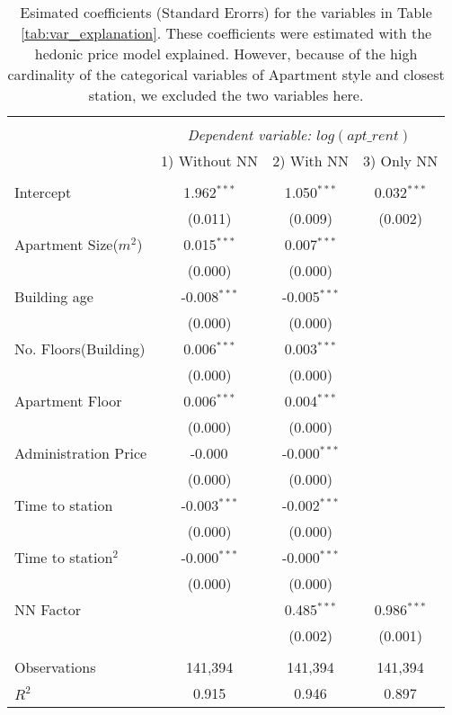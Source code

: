 \begin{table}[!htbp] 
\caption{\label{tab:regression}Esimated coefficients (Standard Erorrs) for the variables in Table \ref{tab:var_explanation}.
These coefficients were estimated with the hedonic price model explained. However, because of the high cardinality 
of the categorical variables of Apartment style and closest station, we excluded the two variables here.
}
 \centering
\begin{tabular}{@{\extracolsep{5pt}}lccc}
\\[-1.8ex]\hline
\hline \\[-1.8ex]
& \multicolumn{3}{c}{\textit{Dependent variable: \( log(apt\_rent) \)}} \
\cr \cline{3-4}
\\[-1.8ex] & \multicolumn{1}{c}{1) Without NN} & \multicolumn{1}{c}{2) With NN} & \multicolumn{1}{c}{3) Only NN}  \\
\hline \\[-1.8ex]
 Intercept & 1.962$^{***}$ & 1.050$^{***}$ & 0.032$^{***}$ \\
  & (0.011) & (0.009) & (0.002) \\
 Apartment Size(\(m^2\)) & 0.015$^{***}$ & 0.007$^{***}$ & \\
  & (0.000) & (0.000) & \\
 Building age & -0.008$^{***}$ & -0.005$^{***}$ & \\
  & (0.000) & (0.000) & \\
 No. Floors(Building) & 0.006$^{***}$ & 0.003$^{***}$ & \\
  & (0.000) & (0.000) & \\
 Apartment Floor & 0.006$^{***}$ & 0.004$^{***}$ & \\
  & (0.000) & (0.000) & \\
 Administration Price & -0.000$^{}$ & -0.000$^{***}$ & \\
  & (0.000) & (0.000) & \\
 Time to station & -0.003$^{***}$ & -0.002$^{***}$ & \\
  & (0.000) & (0.000) & \\
 Time to station\(^2\) & -0.000$^{***}$ & -0.000$^{***}$ & \\
  & (0.000) & (0.000) & \\
 NN Factor & & 0.485$^{***}$ & 0.986$^{***}$ \\
  & & (0.002) & (0.001) \\
\hline \\[-1.8ex]
 Observations & 141,394 & 141,394 & 141,394 \\
 $R^2$ & 0.915 & 0.946 & 0.897 \\

\end{tabular}
\end{table}
